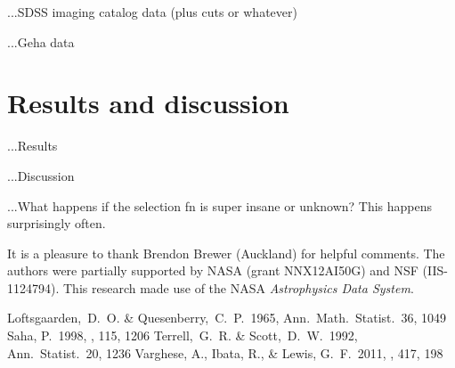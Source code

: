 \documentclass[12pt,pdftex,preprint]{aastex}
\begin{document}
...SDSS imaging catalog data (plus cuts or whatever)

...Geha data

\section{Results and discussion}

...Results

...Discussion

...What happens if the selection fn is super insane or unknown?  This
happens surprisingly often.

\acknowledgements It is a pleasure to thank
  Brendon Brewer (Auckland)
for helpful comments.  The authors were partially supported by NASA
(grant NNX12AI50G) and NSF (IIS-1124794).  This research made use of
the NASA \textsl{Astrophysics Data System}.

\begin{thebibliography}{}
  Loftsgaarden,~D.~O. \& Quesenberry,~C.~P.\ 1965, Ann.\ Math.\ Statist.\ 36, 1049
  Saha, P.\ 1998, \aj, 115, 1206 
  Terrell,~G.~R. \& Scott,~D.~W.\ 1992, Ann.\ Statist.\ 20, 1236
  Varghese, A., Ibata, R., \& Lewis, G.~F.\ 2011, \mnras, 417, 198 
\end{thebibliography}
\end{document}
